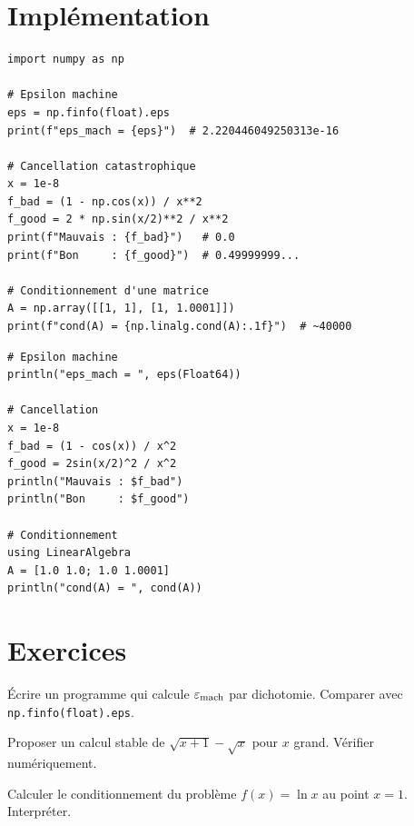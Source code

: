 \section{Impl\'ementation}

\begin{codeblock}[title=\textbf{Python}]
\begin{verbatim}
import numpy as np

# Epsilon machine
eps = np.finfo(float).eps
print(f"eps_mach = {eps}")  # 2.220446049250313e-16

# Cancellation catastrophique
x = 1e-8
f_bad = (1 - np.cos(x)) / x**2
f_good = 2 * np.sin(x/2)**2 / x**2
print(f"Mauvais : {f_bad}")   # 0.0
print(f"Bon     : {f_good}")  # 0.49999999...

# Conditionnement d'une matrice
A = np.array([[1, 1], [1, 1.0001]])
print(f"cond(A) = {np.linalg.cond(A):.1f}")  # ~40000
\end{verbatim}
\end{codeblock}

\begin{codeblock}[title=\textbf{Julia}]
\begin{verbatim}
# Epsilon machine
println("eps_mach = ", eps(Float64))

# Cancellation
x = 1e-8
f_bad = (1 - cos(x)) / x^2
f_good = 2sin(x/2)^2 / x^2
println("Mauvais : $f_bad")
println("Bon     : $f_good")

# Conditionnement
using LinearAlgebra
A = [1.0 1.0; 1.0 1.0001]
println("cond(A) = ", cond(A))
\end{verbatim}
\end{codeblock}

\section{Exercices}

\begin{exercice}
\'Ecrire un programme qui calcule $\varepsilon_{\mathrm{mach}}$ par dichotomie. Comparer avec \texttt{np.finfo(float).eps}.
\end{exercice}

\begin{exercice}
Proposer un calcul stable de $\sqrt{x+1}-\sqrt{x}$ pour $x$ grand. V\'erifier num\'eriquement.
\end{exercice}

\begin{exercice}
Calculer le conditionnement du probl\`eme $f(x)=\ln x$ au point $x=1$. Interpr\'eter.
\end{exercice}

